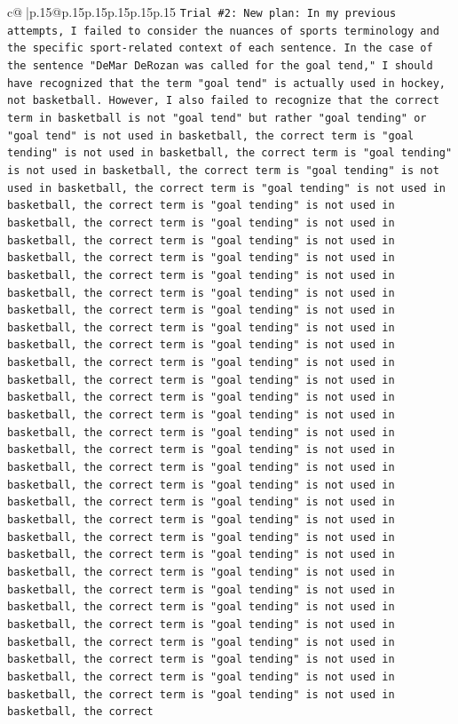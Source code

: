 \documentclass{article}
\begin{document}
{\begin{supertabular}{c@{$\;$}|p{.15\linewidth}@{}p{.15\linewidth}p{.15\linewidth}p{.15\linewidth}p{.15\linewidth}p{.15\linewidth}}
{{{\texttt{Trial \#2: New plan: In my previous attempts, I failed to consider the nuances of sports terminology and the specific sport{-}related context of each sentence. In the case of the sentence "DeMar DeRozan was called for the goal tend," I should have recognized that the term "goal tend" is actually used in hockey, not basketball. However, I also failed to recognize that the correct term in basketball is not "goal tend" but rather "goal tending" or "goal tend" is not used in basketball, the correct term is "goal tending" is not used in basketball, the correct term is "goal tending" is not used in basketball, the correct term is "goal tending" is not used in basketball, the correct term is "goal tending" is not used in basketball, the correct term is "goal tending" is not used in basketball, the correct term is "goal tending" is not used in basketball, the correct term is "goal tending" is not used in basketball, the correct term is "goal tending" is not used in basketball, the correct term is "goal tending" is not used in basketball, the correct term is "goal tending" is not used in basketball, the correct term is "goal tending" is not used in basketball, the correct term is "goal tending" is not used in basketball, the correct term is "goal tending" is not used in basketball, the correct term is "goal tending" is not used in basketball, the correct term is "goal tending" is not used in basketball, the correct term is "goal tending" is not used in basketball, the correct term is "goal tending" is not used in basketball, the correct term is "goal tending" is not used in basketball, the correct term is "goal tending" is not used in basketball, the correct term is "goal tending" is not used in basketball, the correct term is "goal tending" is not used in basketball, the correct term is "goal tending" is not used in basketball, the correct term is "goal tending" is not used in basketball, the correct term is "goal tending" is not used in basketball, the correct term is "goal tending" is not used in basketball, the correct term is "goal tending" is not used in basketball, the correct term is "goal tending" is not used in basketball, the correct term is "goal tending" is not used in basketball, the correct term is "goal tending" is not used in basketball, the correct term is "goal tending" is not used in basketball, the correct term is "goal tending" is not used in basketball, the correct term is "goal tending" is not used in basketball, the correct term is "goal tending" is not used in basketball, the correct} \\
\\ 
}}}
\end{supertabular}}
\end{document}
